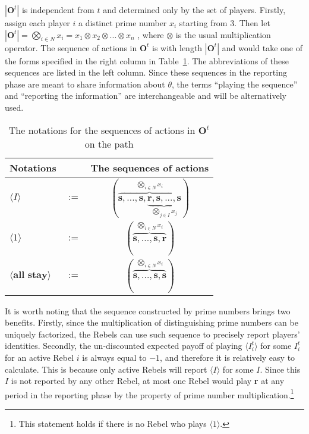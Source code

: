 \documentclass[12pt,letter]{article}
\newcommand{\Omicron}{\mathbf{O}}
\theoremstyle{definition}
\theoremstyle{remark}
\theoremstyle{claim}
\begin{document}
$|\Omicron^{t}|$ is independent from $t$ and determined only by the set of players. Firstly, assign each player $i$ a distinct prime number $x_i$ starting from $3$. Then let $|\Omicron^{t}|=\bigotimes_{i\in N} x_i=x_1\otimes x_2\otimes...\otimes x_n$ , where $\otimes$ is the usual multiplication operator. The sequence of actions in $\Omicron^{t}$ is with length $|\Omicron^t|$ and would take one of the forms specified in the right column in Table~\ref{Table_msg_form}. The abbreviations of these sequences are listed in the left column. Since these sequences in the reporting phase are meant to share information about $\theta$, the terms ``playing the sequence'' and ``reporting the information'' are interchangeable and will be alternatively used.


\begin{table}[!htbp]
\caption{The notations for the sequences of actions in $\Omicron^t$ on the path}
\label{Table_msg_form}
\begin{center}
\begin{tabular}{l c c}
Notations && The sequences of actions\\
\hline
\hline
$\langle  I \rangle$ 				& $:=$ 			& $(\overbrace{\textbf{s},...,\textbf{s},\underbrace{\textbf{r},\textbf{s},...,\textbf{s}}_{\bigotimes_{j\in I}x_j} }^{\bigotimes_{i\in N} x_i})$  \\
$\langle 1 \rangle$	 					& $:=$ 			& $( \overbrace{\textbf{s},...,\textbf{s},{\textbf{r}} }^{\bigotimes_{i\in N} x_i} )$  \\
$\langle \textbf{all stay} \rangle$	 					& $:=$ 			& $(\overbrace{ \textbf{s},...,\textbf{s},{\textbf{s}} }^{\bigotimes_{i\in N} x_i})$  \\
\hline
\end{tabular}
\end{center}
\end{table}


It is worth noting that the sequence constructed by prime numbers brings two benefits. Firstly, since the multiplication of distinguishing prime numbers can be uniquely factorized, the Rebels can use such sequence to precisely report players' identities. Secondly, the un-discounted expected payoff of playing $\langle I^t_i \rangle$ for some $I^t_i$ for an active Rebel $i$ is always equal to $-1$, and therefore it is relatively easy to calculate. This is because only active Rebels will report $\langle I \rangle$ for some $I$. Since this $I$ is not reported by any other Rebel, at most one Rebel would play \textbf{r} at any period in the reporting phase by the property of prime number multiplication.\footnote{This statement holds if there is no Rebel who plays $\langle 1 \rangle$.} 
\end{document}

